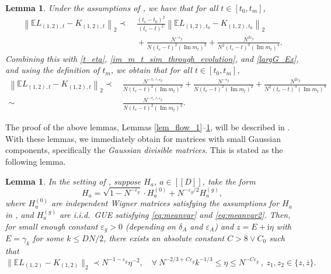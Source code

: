 \documentclass[10pt,reqno]{amsart}
\numberwithin{equation}{section}
\numberwithin{figure}{section}
\theoremstyle{plain} %
\newtheorem{lemma}[theorem]{Lemma}
\theoremstyle{definition} %
\newcommand{\E}{\mathbb{E}}
\newcommand{\ii}{\mathrm{i}}
\renewcommand{\leq}{\le}
\renewcommand{\epsilon}{\varepsilon}
\renewcommand{\bar}{\overline}
\newcommand{\qq}[1]{[\![{#1}]\!]}
\newcommand{\qa}[1]{\left[{#1}\right]}
\newcommand{\be}{\begin{equation}}
\newcommand{\ee}{\end{equation}}
\newcommand{\e}{{\varepsilon}}
\numberwithin{equation}{section}
\begin{document}
\begin{lemma}\label{lem_flow_3}
    Under the assumptions of , we have that for all $t\in [t_0,t_m]$,
    \begin{equation}\label{flow_3_result}
        \begin{aligned}
            \left\|\mathbb{E} L_{(1,2), t}-K_{(1,2), t}\right\|_2 \prec&~ \frac{\left(t_c-t_0\right)^2}{\left(t_c-t\right)^2}\left\|\mathbb{E} L_{(1,2), t_0}-K_{(1,2), t_0}\right\|_2\\
            &~+\frac{N^{-\epsilon_g}}{N\left(t_c-t\right)^2\left(\operatorname{Im} m_t\right)^2}+\frac{N^{2 \epsilon_g}}{N^2\left(t_c-t\right)^3\left(\operatorname{Im} m_t\right)^4}.
        \end{aligned}
    \end{equation}
    Combining this with \eqref{t_eta}, \eqref{im_m_t_sim_through_evolution}, and \eqref{largG_Ex}, and using the definition of $t_m$, we obtain that for all $t\in\qa{t_0,t_m}$,
    \begin{equation}\label{flow_3_result_2}
        \begin{aligned}
            \left\|\mathbb{E} L_{(1,2), t}-K_{(1,2), t}\right\|_2\prec&~ \frac{N^{-\tau_e\wedge\epsilon_g}}{N\left(t_c-t\right)^2\left(\operatorname{Im} m_t\right)^2}+\frac{N^{-\epsilon_g}}{N\left(t_c-t\right)^2\left(\operatorname{Im} m_t\right)^2}+\frac{N^{2 \epsilon_g}}{N^2\left(t_c-t\right)^3\left(\operatorname{Im} m_t\right)^4}\\
            \sim&~ \frac{N^{-\tau_e\wedge\epsilon_g}}{N\left(t_c-t\right)^2\left(\operatorname{Im} m_t\right)^2}.
        \end{aligned}
    \end{equation}
\end{lemma}

The proof of the above lemmas, Lemmas \ref{lem_flow_1}--\ref{lem_flow_3}, will be described in . 
With these lemmas, we immediately obtain  for matrices with small Gaussian components, specifically the \emph{Gaussian divisible matrices}. This is stated as the following lemma.

\begin{lemma}\label{main_lemma_G}
In the setting of , suppose $H_a$, $a\in \qq D$, take the form
\be\label{Gcom_a}
H_a = \sqrt{1-N^{-\e_g}}\cdot H_a^{(0)}+ {N^{-\e_g/2}} H_a^{(g)},
\ee
where $H_a^{(0)}$ are independent Wigner matrices satisfying the assumptions for $H_a$ in , and $H_a^{(g)}$ are i.i.d.~GUE satisfying \eqref{eq:meanvar} and \eqref{eq:meanvar2}. Then, for small enough constant $\e_g>0$ (depending on $\delta_A$ and $\e_A$) and $z=E+\ii\eta $ with $E=\gamma_k$ for some $k\leq DN/2$, there exists an absolute constant $C>8\vee C_0$ such that 
\be\label{main_G_es}
\|\E L_{(1,2)}- K_{(1,2)}\|_{2}\prec N^{-1-\e_g}\eta^{-2},\quad \forall \  N^{-2/3+C\e_g }k^{-1/3} \le \eta \le N^{-C\e_g }\ , \ z_1,z_2\in \{z, \bar z\}.
\ee
\end{lemma}
\end{document}
